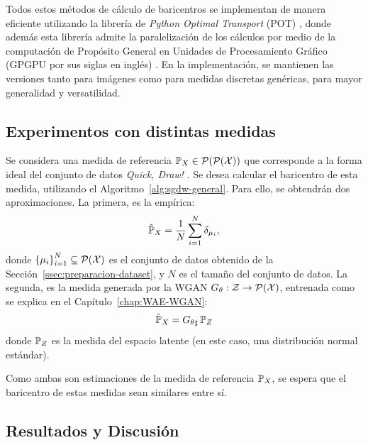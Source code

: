 Todos estos métodos de cálculo de baricentros se implementan de manera eficiente utilizando la librería de \textit{Python Optimal Transport} (POT) \cite{flamary2021pot}, donde además esta librería admite la paralelización de los cálculos por medio de la computación de Propósito General en Unidades de Procesamiento Gráfico (GPGPU por sus siglas en inglés) \cite{owens2008gpu}. En la implementación, se mantienen las versiones tanto para imágenes como para medidas discretas genéricas, para mayor generalidad y versatilidad.

\subsection{Experimentos con distintas medidas}\label{ssec:muestreando-gamma}  %


Se considera una medida de referencia $\Prob_X \in \ProbSpace[\ProbSpace[\cX]]$ que corresponde a la forma ideal del conjunto de datos \textit{Quick, Draw!} \cite{jongejan2016quick}. Se desea calcular el baricentro de esta medida, utilizando el Algoritmo~\ref{alg:sgdw-general}. Para ello, se obtendrán dos aproximaciones. La primera, es la empírica:
\begin{equation}
    \hat \Prob_X = \frac{1}{N} \sum_{i=1}^{N} \delta_{\mu_i},
\end{equation}
donde $\left\{ \mu_i \right\}_{i=1}^{N} \subseteq \ProbSpace[\cX] $ es el conjunto de datos obtenido de la Sección~\ref{ssec:preparacion-dataset}, y $N$ es el tamaño del conjunto de datos. La segunda, es la medida generada por la WGAN $G_\theta : \cZ \to \ProbSpace[\cX]$, entrenada como se explica en el Capítulo~\ref{chap:WAE-WGAN}:
\begin{equation}
    \tilde \Prob_X
    = \pf{G_\theta} \Prob_Z
\end{equation}
donde $\Prob_Z$ es la medida del espacio latente (en este caso, una distribución normal estándar).

Como ambas son estimaciones de la medida de referencia $\Prob_X$, se espera que el baricentro de estas medidas sean similares entre sí.

\subsection{Resultados y Discusión}\label{ssec:sgdw-resultados-discusion}  %

